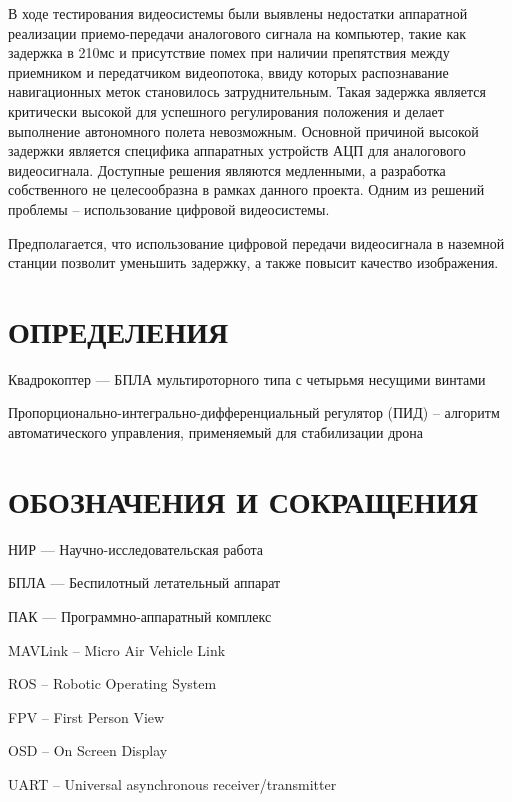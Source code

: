 \documentclass[a4paper,12pt]{article}
\begin{document}
В ходе тестирования видеосистемы были выявлены недостатки аппаратной реализации приемо-передачи аналогового сигнала на компьютер, такие как задержка в 210мс и присутствие помех при наличии препятствия между приемником и передатчиком видеопотока, ввиду которых распознавание навигационных меток становилось затруднительным. 
Такая задержка является критически высокой для успешного регулирования положения и делает выполнение автономного полета невозможным. 
Основной причиной высокой задержки является специфика аппаратных устройств АЦП для аналогового видеосигнала.
Доступные решения являются медленными, а разработка собственного не целесообразна в рамках данного проекта. Одним из решений проблемы -- использование цифровой видеосистемы.

Предполагается, что использование цифровой передачи видеосигнала в наземной станции позволит уменьшить задержку, а также повысит качество изображения.



\pagebreak
\thispagestyle{empty}

\section*{\centering ОПРЕДЕЛЕНИЯ}

\thispagestyle{empty} %

Квадрокоптер --- БПЛА мультироторного типа с четырьмя несущими винтами

Пропорционально-интегрально-дифференциальный регулятор (ПИД) – алгоритм автоматического управления, применяемый для стабилизации дрона

\pagebreak
\thispagestyle{empty}

\section*{\centering ОБОЗНАЧЕНИЯ И СОКРАЩЕНИЯ}

НИР --- Научно-исследовательская работа

БПЛА --- Беспилотный летательный аппарат

ПАК --- Программно-аппаратный комплекс

MAVLink -- Micro Air Vehicle Link

ROS -- Robotic Operating System

FPV -- First Person View

OSD -- On Screen Display

UART -- Universal asynchronous receiver/transmitter
\end{document}
